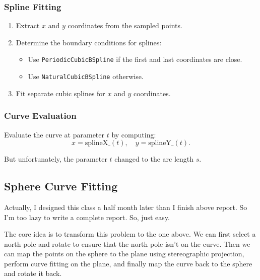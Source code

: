 \documentclass[a4paper]{article}
\begin{document}
\subsubsection{Spline Fitting}

\begin{enumerate}
    \item Extract $x$ and $y$ coordinates from the sampled points.
    \item Determine the boundary conditions for splines:
    \begin{itemize}
        \item Use \texttt{PeriodicCubicBSpline} if the first and last coordinates are close.
        \item Use \texttt{NaturalCubicBSpline} otherwise.
    \end{itemize}
    \item Fit separate cubic splines for $x$ and $y$ coordinates.
\end{enumerate}

\subsubsection{Curve Evaluation}

Evaluate the curve at parameter $t$ by computing:
\[
x = \text{splineX\_}(t), \quad y = \text{splineY\_}(t).
\]

But unfortunately, the parameter $t$ changed to the arc length $s$.

\subsection{Sphere Curve Fitting}
Actually, I designed this class a half month later than I finish above report. So I'm too lazy to write a complete report. So, just easy.

The core idea is to transform this problem to the one above. We can first select a north pole and rotate to ensure that the north pole isn't on the curve. Then we can map the points on the sphere to the plane using stereographic projection, perform curve fitting on the plane, and finally map the curve back to the sphere and rotate it back.
\end{document}

